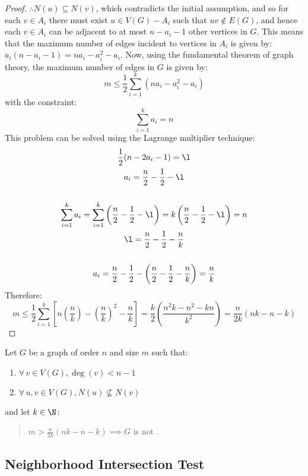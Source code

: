 \begin{proof}
  \(\therefore N(u)\subseteq N(v)\), which contradicts the initial assumption, and so for each \(v\in A_i\) there must exist
  \(u\in V(G)-A_i\) such that \(uv\notin E(G)\), and hence each \(v\in A_i\) can be adjacent to at most \(n-a_i-1\) other
  vertices in \(G\).  This means that the maximum number of edges incident to vertices in \(A_i\) is given by:
  \(a_i(n-a_i-1)=na_i-a_i^2-a_i\).  Now, using the fundamental theorem of graph theory, the maximum number of edges in \(G\) is
  given by:
  \[m\le\frac{1}{2}\sum_{i=1}^k(na_i-a_i^2-a_i)\]
  with the constraint:
  \[\sum_{i=1}^ka_i=n\]
  This problem can be solved using the Lagrange multiplier technique:
  \begin{gather*}
    \frac{1}{2}(n-2a_i-1)=\l \\
    a_i=\frac{n}{2}-\frac{1}{2}-\l \\
    \\
    \sum_{i=1}^ka_i=\sum_{i=1}^k\left(\frac{n}{2}-\frac{1}{2}-\l\right)=k\left(\frac{n}{2}-\frac{1}{2}-\l\right)=n \\
    \l=\frac{n}{2}-\frac{1}{2}-\frac{n}{k} \\
    \\
    a_i=\frac{n}{2}-\frac{1}{2}-\left(\frac{n}{2}-\frac{1}{2}-\frac{n}{k}\right)=\frac{n}{k}
  \end{gather*}
  Therefore:
  \[m\le\frac{1}{2}\sum_{i=1}^k\left[n\left(\frac{n}{k}\right)-\left(\frac{n}{k}\right)^2-\frac{n}{k}\right]=
  \frac{k}{2}\left(\frac{n^2k-n^2-kn}{k^2}\right)=\frac{n}{2k}(nk-n-k)\]
\end{proof}

\begin{corollary}
  \label{cor:tighter}
  Let \(G\) be a graph of order \(n\) and size \(m\) such that:
  \begin{enumerate}
  \item \(\forall\,v\in V(G),\deg(v)<n-1\)
  \item \(\forall\,u,v\in V(G),N(u)\not\subseteq N(v)\)
  \end{enumerate}
  and let \(k\in\N\):
  \begin{quote}
    \(\displaystyle m>\frac{n}{2k}(nk-n-k)\implies G\) is not .
  \end{quote}
\end{corollary}

\subsection*{Neighborhood Intersection Test}

